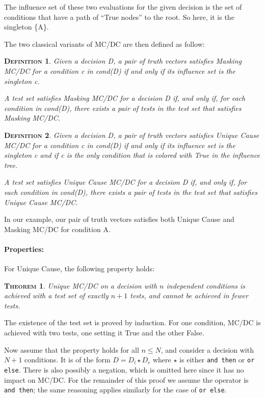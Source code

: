 \documentclass[a4paper,12pt,twoside]{article}
\renewcommand{\le}{\leqslant}
\newcommand{\anysc}{\star}
\newcommand{\andthen}{\texttt{and then}}
\newcommand{\orelse}{\texttt{or else}}
\newtheorem{theorem}{\textsc{Theorem}}
\newtheorem{definition}{\textsc{Definition}}
\begin{document}
The influence set of these two evaluations for the given decision is
the set of conditions that have a path of ``True nodes'' to the root.
So here, it is the singleton \{A\}.

The two classical variants of MC/DC are then defined as follow:

\begin{definition}
  \label{def:masking-mcdc}
  Given a decision D, a pair of truth vectors satisfies Masking MC/DC
  for a condition c in cond(D) if and only if its influence set is the
  singleton {c}.

  A test set satisfies Masking MC/DC for a decision D if, and only if,
  for each condition in cond(D), there exists a pair of tests in the
  test set that satisfies Masking MC/DC.
\end{definition}

\begin{definition}
  \label{def:unique-cause}
  Given a decision D, a pair of truth vectors satisfies Unique Cause MC/DC
  for a condition c in cond(D) if and only if its influence set is the
  singleton {c} and if c is the only condition that is colored with True
  in the influence tree.

  A test set satisfies Unique Cause MC/DC for a decision D if, and only if,
  for each condition in cond(D), there exists a pair of tests in the
  test set that satisfies Unique Cause MC/DC.
\end{definition}

In our example, our pair of truth vectors satisfies both Unique Cause and
Masking MC/DC for condition A.

\paragraph{Properties:}

For Unique Cause, the following property holds:

\begin{theorem}
Unique MC/DC on a decision with $n$ independent conditions is achieved with
a test set of exactly $n+1$ tests, and cannot be achieved in fewer tests.
\end{theorem}

The existence of the test set is proved by induction. For one condition,
MC/DC is achieved with two tests, one setting it True and the other False.

Now assume that the property holds for all $n \le{} N$, and consider a decision
with $N+1$ conditions. It is of the form $D = D_l \anysc{} D_r$ where
$\anysc{}$ is either \andthen{} or \orelse{}. There is also possibly a
negation, which is omitted here since it has no impact on MC/DC. For the
remainder of this proof we assume the operator is \andthen{}; the same
reasoning applies similarly for the case of \orelse{}.
\end{document}
